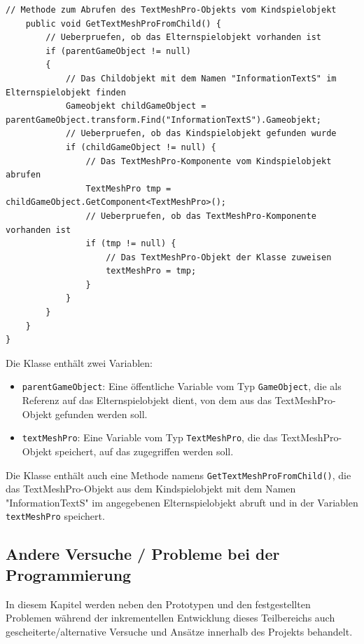 \begin{itemize}
\begin{lstlisting}[style=csharp, caption={Kind vom Gameobjekt bekommen}, label=code:]
    // Methode zum Abrufen des TextMeshPro-Objekts vom Kindspielobjekt
    public void GetTextMeshProFromChild() {
        // Ueberpruefen, ob das Elternspielobjekt vorhanden ist
        if (parentGameObject != null)
        {
            // Das Childobjekt mit dem Namen "InformationTextS" im Elternspielobjekt finden
            Gameobjekt childGameObject = parentGameObject.transform.Find("InformationTextS").Gameobjekt;
            // Ueberpruefen, ob das Kindspielobjekt gefunden wurde
            if (childGameObject != null) {
                // Das TextMeshPro-Komponente vom Kindspielobjekt abrufen
                TextMeshPro tmp = childGameObject.GetComponent<TextMeshPro>();
                // Ueberpruefen, ob das TextMeshPro-Komponente vorhanden ist
                if (tmp != null) {
                    // Das TextMeshPro-Objekt der Klasse zuweisen
                    textMeshPro = tmp;
                }
            }
        }
    }
}
    \end{lstlisting}
    Die Klasse enthält zwei Variablen:

    \begin{itemize}
        \item \texttt{parentGameObject}: Eine öffentliche Variable vom Typ \texttt{GameObject}, die als Referenz auf das Elternspielobjekt dient, von dem aus das TextMeshPro-Objekt gefunden werden soll.
        \item \texttt{textMeshPro}: Eine Variable vom Typ \texttt{TextMeshPro}, die das TextMeshPro-Objekt speichert, auf das zugegriffen werden soll.
    \end{itemize}

    Die Klasse enthält auch eine Methode namens \texttt{GetTextMeshProFromChild()}, die das TextMeshPro-Objekt aus dem Kindspielobjekt mit dem Namen "InformationTextS" im angegebenen Elternspielobjekt abruft und in der Variablen \texttt{textMeshPro} speichert.

    \subsection{Andere Versuche / Probleme bei der Programmierung}
    In diesem Kapitel werden neben den Prototypen und den festgestellten Problemen während der inkrementellen Entwicklung dieses Teilbereichs auch gescheiterte/alternative Versuche und Ansätze innerhalb des Projekts behandelt.



\end{itemize}
